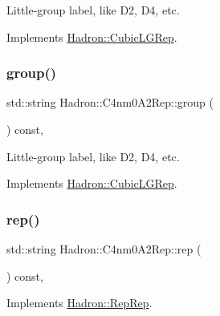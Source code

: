 Little-\/group label, like D2, D4, etc. 

Implements \mbox{\hyperlink{structHadron_1_1CubicLGRep_a9bdb14b519a611d21379ed96a3a9eb41}{Hadron\+::\+Cubic\+L\+G\+Rep}}.

\mbox{\label{structHadron_1_1C4nm0A2Rep_aaba4ff31952a682fa280fc4c8803dbc3}} 
\subsubsection{\texorpdfstring{group()}{group()}\hspace{0.1cm}{\footnotesize\ttfamily [3/3]}}
{\footnotesize\ttfamily std\+::string Hadron\+::\+C4nm0\+A2\+Rep\+::group (\begin{DoxyParamCaption}{ }\end{DoxyParamCaption}) const\hspace{0.3cm}{\ttfamily [inline]}, {\ttfamily [virtual]}}

Little-\/group label, like D2, D4, etc. 

Implements \mbox{\hyperlink{structHadron_1_1CubicLGRep_a9bdb14b519a611d21379ed96a3a9eb41}{Hadron\+::\+Cubic\+L\+G\+Rep}}.

\mbox{\label{structHadron_1_1C4nm0A2Rep_a33fdf55c4518f4e03005b1fc05271695}} 
\subsubsection{\texorpdfstring{rep()}{rep()}\hspace{0.1cm}{\footnotesize\ttfamily [1/3]}}
{\footnotesize\ttfamily std\+::string Hadron\+::\+C4nm0\+A2\+Rep\+::rep (\begin{DoxyParamCaption}{ }\end{DoxyParamCaption}) const\hspace{0.3cm}{\ttfamily [inline]}, {\ttfamily [virtual]}}



Implements \mbox{\hyperlink{structHadron_1_1RepRep_ab3213025f6de249f7095892109575fde}{Hadron\+::\+Rep\+Rep}}.

\mbox{\label{structHadron_1_1C4nm0A2Rep_a33fdf55c4518f4e03005b1fc05271695}} 
